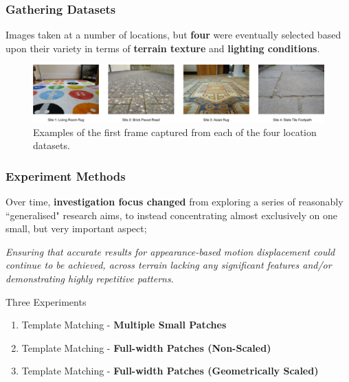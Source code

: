 \documentclass[10pt, compress]{beamer}
\begin{document}
\begin{frame}[fragile]
  \frametitle{Gathering Datasets}
  
  Images taken at a number of locations, but \textbf{four} were eventually selected based upon their variety in terms of \textbf{terrain texture} and \textbf{lighting conditions}.
  
  \vspace{15pt}
  
    \begin{figure}[ht!]
\centering
\includegraphics[scale=0.27]{locations}
\caption{Examples of the first frame captured from each of the four location datasets.}
  \end{figure}
  
\end{frame}

\begin{frame}[fragile]
  \frametitle{Experiment Methods}
  
  {\normalsize Over time, \textbf{investigation focus changed} from exploring a series of reasonably ``generalised" research aims, to instead concentrating almost exclusively on one small, but very important aspect; 
  \vspace{-10pt}
  
  \begin{block}{}
  \textit{Ensuring that accurate results for appearance-based motion displacement could continue to be achieved, across terrain lacking any significant features and/or demonstrating highly repetitive patterns}.
  \end{block}}
		
  \begin{block}{Three Experiments}
  \begin{enumerate}[label={\arabic*.}]
  	  
  \item Template Matching - \textbf{Multiple Small Patches}

  \item Template Matching - \textbf{Full-width Patches (Non-Scaled)}
  
  \item Template Matching - \textbf{Full-width Patches (Geometrically Scaled)}
 
\end{enumerate}
\end{block}

\end{frame}
\end{document}
